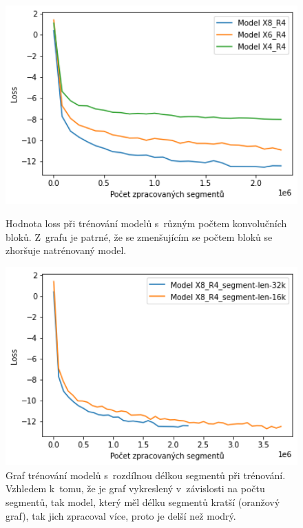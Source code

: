 \begin{figure}[H]
    \centering
    \begin{minipage}{0.45\textwidth}
        \centering
        \includegraphics[width=1.0\textwidth]{obrazky-figures/expX864R4trainloss.png}
        \caption{\label{graf:X864R4trainloss}Hodnota loss při trénování modelů s~různým počtem konvolučních bloků. Z~grafu je patrné, že se zmenšujícím se počtem bloků se zhoršuje natrénovaný model.}
    \end{minipage}\hfill
    \begin{minipage}{0.45\textwidth}
        \centering
        \includegraphics[width=1.0\textwidth]{obrazky-figures/expX8R4trainlosssegments.png}
        \caption{\label{graf:X8R4trainlosssegments}Graf trénování modelů s~rozdílnou délkou segmentů při trénování. Vzhledem k~tomu, že je graf vykreslený v~závislosti na počtu segmentů, tak model, který měl délku segmentů kratší (oranžový graf), tak jich zpracoval více, proto je delší než modrý.}
    \end{minipage}
\end{figure}

